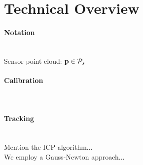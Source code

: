 \section{Technical Overview}
\label{sec:overview}

\paragraph{Notation} \\
Sensor point cloud: $\mathbf{p} \in \mathcal{P}_{s}$ 

\paragraph{Calibration} \\

\paragraph{Tracking} \\
Mention the ICP algorithm... \\
We employ a Gauss-Newton approach... \\
